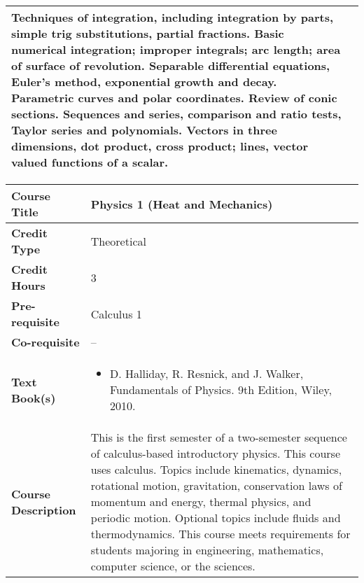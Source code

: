 \documentclass[11pt]{article}
\begin{document}
\begin{table}[h!]
\begin{tabular}{|l|l|}
\begin{minipage}{.70\textwidth}
Techniques of integration, including integration by parts, simple trig substitutions, partial fractions. Basic numerical integration; improper integrals; arc length; area of surface of revolution. Separable differential equations, Euler's method, exponential growth and decay. Parametric curves and polar coordinates. Review of conic sections. Sequences and series, comparison and ratio tests, Taylor series and polynomials. Vectors in three dimensions, dot product, cross product; lines, vector valued functions of a scalar.

\vspace{3mm}
\end{minipage} \\ \hline
\end{tabular}
\end{table}



\begin{table}[h!]
\begin{tabular}{|l|l|}
\hline
\textbf{Course Title}       &   Physics 1 (Heat and Mechanics)\\ \hline
\textbf{Credit Type}        &  Theoretical \\ \hline
\textbf{Credit Hours}       &  3 \\ \hline
\textbf{Pre-requisite}       &  Calculus 1 \\ \hline
\textbf{Co-requisite}       &  -- \\ \hline
\textbf{Text Book(s)}       & \begin{minipage}{.70\textwidth}
\begin{itemize} \itemsep-0.4em
	\vspace{3mm}
	\item D. Halliday, R. Resnick, and J. Walker, Fundamentals of Physics. 9th Edition, Wiley, 2010.
	\vspace{3mm}
\end{itemize}
\end{minipage}\\ \hline
\textbf{Course Description} & \begin{minipage}{.70\textwidth}
\vspace{3mm}
This is the first semester of a two-semester sequence of calculus-based introductory physics. This course uses calculus. Topics include kinematics, dynamics, rotational motion, gravitation, conservation laws of momentum and energy, thermal physics, and periodic motion.  Optional topics include fluids and thermodynamics.  This course meets requirements for students majoring in engineering, mathematics, computer science, or the sciences.
\vspace{3mm}
\end{minipage} \\ \hline
\end{tabular}
\end{table}
\end{document}

